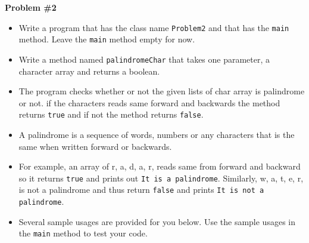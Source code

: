 \documentclass[12pt]{article}
\begin{document}
\vspace*{0.5cm}
\noindent\textbf{Problem \#2}
\begin{itemize}
	\item Write a program that has the class name \texttt{Problem2} and that has the \texttt{main} method. Leave the \texttt{main} method empty for now.
	\item Write a method named \texttt{palindromeChar} that takes one parameter, a character array and returns a boolean.
	\item The program checks whether or not the given lists of char array is palindrome or not. if the characters reads same forward and backwards the method returns \texttt{true} and if not the method returns \texttt{false}.
	\item A palindrome is a sequence of words, numbers or any characters that is the same when written forward or backwards.
	\item For example, an array of \textquotesingle r\textquotesingle , \textquotesingle a\textquotesingle, \textquotesingle d\textquotesingle, \textquotesingle a\textquotesingle, \textquotesingle r\textquotesingle, reads same from forward and backward so it returns \texttt{true} and prints out \texttt{It is a palindrome}. Similarly, \textquotesingle w\textquotesingle, \textquotesingle a\textquotesingle, \textquotesingle t\textquotesingle, \textquotesingle e\textquotesingle, \textquotesingle r\textquotesingle, is not a palindrome and thus return \texttt{false} and prints \texttt{It is not a palindrome}.
	\item Several sample usages are provided for you below. Use the sample usages in the \texttt{main} method to test your code.
\end{itemize}
\end{document}
